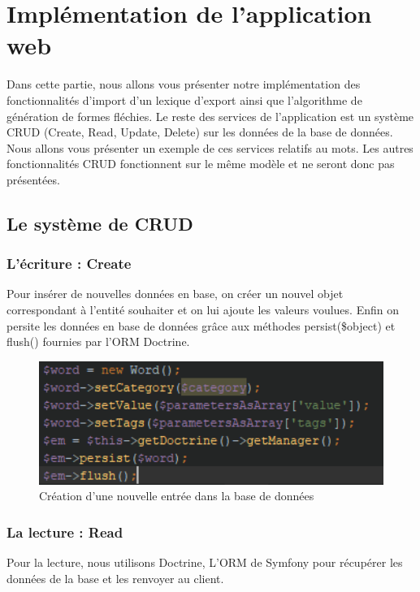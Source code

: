 \documentclass[12pt,a4paper]{article}
\begin{document}
    \newpage

    \section{Implémentation de l'application web}

    Dans cette partie, nous allons vous présenter notre implémentation des fonctionnalités d'import d'un lexique d'export ainsi que l'algorithme de génération de formes fléchies.
    Le reste des services de l'application est un système CRUD (Create, Read, Update, Delete) sur les données de la base de données.
    Nous allons vous présenter un exemple de ces services relatifs au mots. Les autres fonctionnalités CRUD fonctionnent sur le même modèle et ne seront donc pas présentées.

    \subsection{Le système de CRUD}

    \subsubsection{L'écriture : Create}

    Pour insérer de nouvelles données en base, on créer un nouvel objet correspondant à l'entité souhaiter et on lui ajoute les valeurs voulues.
    Enfin on persite les données en base de données grâce aux méthodes persist(\$object) et flush() fournies par l'ORM Doctrine.

    \begin{figure}[h]
        \centering
        \includegraphics[width=150mm]{img/addWord.PNG}
        \caption{Création d'une nouvelle entrée dans la base de données}
        \label{Tux}
    \end{figure}

    \subsubsection{La lecture : Read}
    Pour la lecture, nous utilisons Doctrine, L'ORM de Symfony pour récupérer les données de la base et les renvoyer au client.
\end{document}
